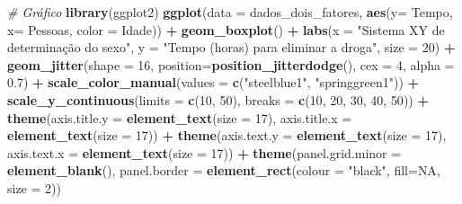 \documentclass[
]{book}
\newenvironment{Shaded}{\begin{snugshade}}{\end{snugshade}}
\newcommand{\CommentTok}[1]{\textcolor[rgb]{0.56,0.35,0.01}{\textit{#1}}}
\newcommand{\DataTypeTok}[1]{\textcolor[rgb]{0.13,0.29,0.53}{#1}}
\newcommand{\DecValTok}[1]{\textcolor[rgb]{0.00,0.00,0.81}{#1}}
\newcommand{\FloatTok}[1]{\textcolor[rgb]{0.00,0.00,0.81}{#1}}
\newcommand{\KeywordTok}[1]{\textcolor[rgb]{0.13,0.29,0.53}{\textbf{#1}}}
\newcommand{\NormalTok}[1]{#1}
\newcommand{\OperatorTok}[1]{\textcolor[rgb]{0.81,0.36,0.00}{\textbf{#1}}}
\newcommand{\OtherTok}[1]{\textcolor[rgb]{0.56,0.35,0.01}{#1}}
\newcommand{\StringTok}[1]{\textcolor[rgb]{0.31,0.60,0.02}{#1}}
\begin{document}
\begin{Shaded}
\begin{Highlighting}[]
\CommentTok{# Gráfico}
\KeywordTok{library}\NormalTok{(ggplot2)}
\KeywordTok{ggplot}\NormalTok{(}\DataTypeTok{data =}\NormalTok{ dados_dois_fatores, }\KeywordTok{aes}\NormalTok{(}\DataTypeTok{y=}\NormalTok{ Tempo, }\DataTypeTok{x=}\NormalTok{ Pessoas, }\DataTypeTok{color =}\NormalTok{ Idade)) }\OperatorTok{+}\StringTok{ }
\StringTok{  }\KeywordTok{geom_boxplot}\NormalTok{() }\OperatorTok{+}
\StringTok{  }\KeywordTok{labs}\NormalTok{(}\DataTypeTok{x =} \StringTok{"Sistema XY de determinação do sexo"}\NormalTok{, }\DataTypeTok{y =} \StringTok{"Tempo (horas) para eliminar a droga"}\NormalTok{, }
       \DataTypeTok{size =} \DecValTok{20}\NormalTok{) }\OperatorTok{+}
\StringTok{  }\KeywordTok{geom_jitter}\NormalTok{(}\DataTypeTok{shape =} \DecValTok{16}\NormalTok{, }\DataTypeTok{position=}\KeywordTok{position_jitterdodge}\NormalTok{(), }\DataTypeTok{cex =} \DecValTok{4}\NormalTok{, }\DataTypeTok{alpha =} \FloatTok{0.7}\NormalTok{) }\OperatorTok{+}
\StringTok{  }\KeywordTok{scale_color_manual}\NormalTok{(}\DataTypeTok{values =} \KeywordTok{c}\NormalTok{(}\StringTok{"steelblue1"}\NormalTok{, }\StringTok{"springgreen1"}\NormalTok{)) }\OperatorTok{+}
\StringTok{  }\KeywordTok{scale_y_continuous}\NormalTok{(}\DataTypeTok{limits =} \KeywordTok{c}\NormalTok{(}\DecValTok{10}\NormalTok{, }\DecValTok{50}\NormalTok{), }\DataTypeTok{breaks =} \KeywordTok{c}\NormalTok{(}\DecValTok{10}\NormalTok{, }\DecValTok{20}\NormalTok{, }\DecValTok{30}\NormalTok{, }\DecValTok{40}\NormalTok{, }\DecValTok{50}\NormalTok{)) }\OperatorTok{+}
\StringTok{  }\KeywordTok{theme}\NormalTok{(}\DataTypeTok{axis.title.y =} \KeywordTok{element_text}\NormalTok{(}\DataTypeTok{size =} \DecValTok{17}\NormalTok{), }\DataTypeTok{axis.title.x =} \KeywordTok{element_text}\NormalTok{(}\DataTypeTok{size =} \DecValTok{17}\NormalTok{)) }\OperatorTok{+}
\StringTok{  }\KeywordTok{theme}\NormalTok{(}\DataTypeTok{axis.text.y =} \KeywordTok{element_text}\NormalTok{(}\DataTypeTok{size =} \DecValTok{17}\NormalTok{), }\DataTypeTok{axis.text.x =} \KeywordTok{element_text}\NormalTok{(}\DataTypeTok{size =} \DecValTok{17}\NormalTok{)) }\OperatorTok{+}
\StringTok{  }\KeywordTok{theme}\NormalTok{(}\DataTypeTok{panel.grid.minor =} \KeywordTok{element_blank}\NormalTok{(), }
        \DataTypeTok{panel.border =} \KeywordTok{element_rect}\NormalTok{(}\DataTypeTok{colour =} \StringTok{"black"}\NormalTok{, }\DataTypeTok{fill=}\OtherTok{NA}\NormalTok{, }\DataTypeTok{size =} \DecValTok{2}\NormalTok{)) }
\end{Highlighting}
\end{Shaded}
\end{document}
